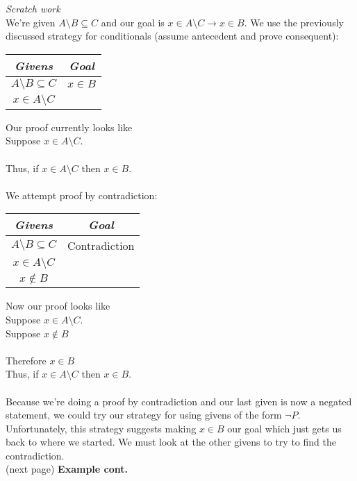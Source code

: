 \documentclass{report}
\theoremstyle{definition}
\begin{document}
\textit{Scratch work}\\
We're given $A\setminus B\subseteq C$ and our goal is $x\in A\setminus C\to x\in B$. We use the previously discussed strategy for conditionals (assume antecedent and prove consequent):
\begin{center}
\begin{tabular}{c|c}
\textit{Givens}&\textit{Goal}\\
\hline
$A\setminus B\subseteq C$&$x\in B$\\
$x\in A\setminus C$&
\end{tabular}
\end{center}
Our proof currently looks like\\
\indent Suppose $x\in A\setminus C$.\\
\indent{}\\
\indent Thus, if $x\in A\setminus C$ then $x\in B$.\\
\vspace{1mm}\\
We attempt proof by contradiction:
\begin{center}
\begin{tabular}{c|c}
\textit{Givens}&\textit{Goal}\\
\hline
$A\setminus B\subseteq C$&Contradiction\\
$x\in A\setminus C$&\\
$x\notin B$&
\end{tabular}
\end{center}
Now our proof looks like\\
\indent Suppose $x\in A\setminus C$.\\
\indent\indent Suppose $x\notin B$\\
\indent\indent{}\\
\indent\indent Therefore $x\in B$\\
\indent Thus, if $x\in A\setminus C$ then $x\in B$.\\
\vspace{1mm}\\
Because we're doing a proof by contradiction and our last given is now a negated statement, we could try our strategy for using givens of the form $\neg P$. Unfortunately, this strategy suggests
making $x\in B$ our goal which just gets us back to where we started. We must look at the other givens to try to find the contradiction.\\
(next page)\newpage
\noindent\textbf{Example cont.}\\
\end{document}

